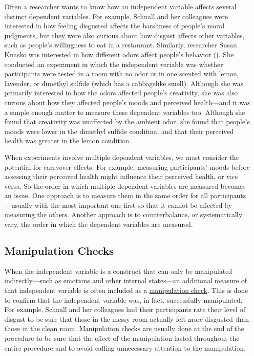 \documentclass[
]{krantz}
\begin{document}
Often a researcher wants to know how an independent variable affects several distinct dependent variables. For example, Schnall and her colleagues were interested in how feeling disgusted affects the harshness of people's moral judgments, but they were also curious about how disgust affects other variables, such as people's willingness to eat in a restaurant. Similarly, researcher Susan Knasko was interested in how different odors affect people's behavior (). She conducted an experiment in which the independent variable was whether participants were tested in a room with no odor or in one scented with lemon, lavender, or dimethyl sulfide (which has a cabbagelike smell). Although she was primarily interested in how the odors affected people's creativity, she was also curious about how they affected people's moods and perceived health---and it was a simple enough matter to measure these dependent variables too. Although she found that creativity was unaffected by the ambient odor, she found that people's moods were lower in the dimethyl sulfide condition, and that their perceived health was greater in the lemon condition.

When experiments involve multiple dependent variables, we must consider the potential for carryover effects. For example, measuring participants' moods before assessing their perceived health might influence their perceived health, or vice versa. So the order in which multiple dependent variables are measured becomes an issue. One approach is to measure them in the same order for all participants---usually with the most important one first so that it cannot be affected by measuring the others. Another approach is to counterbalance, or systematically vary, the order in which the dependent variables are measured.

\subsection*{Manipulation Checks}\label{manipulation-checks}


When the independent variable is a construct that can only be manipulated indirectly---such as emotions and other internal states---an additional measure of that independent variable is often included as a \hyperref[manipulation-check]{manipulation check}. This is done to confirm that the independent variable was, in fact, successfully manipulated. For example, Schnall and her colleagues had their participants rate their level of disgust to be sure that those in the messy room actually felt more disgusted than those in the clean room. Manipulation checks are usually done at the end of the procedure to be sure that the effect of the manipulation lasted throughout the entire procedure and to avoid calling unnecessary attention to the manipulation.
\end{document}
